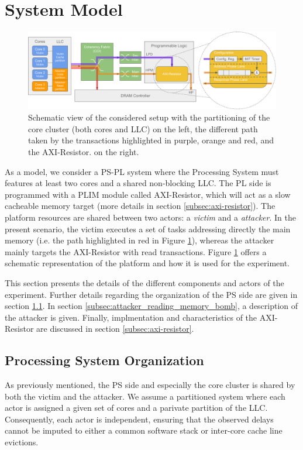 \section{System Model}
    \label{sec:system_model}
    \begin{figure}
        \centering
        \includegraphics[scale=0.56]{images/Evaluation_setup.pdf}
        \caption{Schematic view of the considered setup with the partitioning of the core cluster (both cores and LLC) on the left, the different path taken by the transactions highlighted in purple, orange and red, and the AXI-Resistor. on the right.}
        \label{fig:system_schematic}
    \end{figure}

    As a model, we consider a PS-PL system where the Processing System must features at least two cores and a shared non-blocking LLC.
    The PL side is programmed with a PLIM module called AXI-Resistor, which will act as a slow cacheable memory target (more details in section \ref{subsec:axi-resistor}).
    The platform resources are shared between two actors: a \emph{victim} and a \emph{attacker}.
    In the present scenario, the victim executes a set of tasks addressing directly the main memory (i.e. the path highlighted in red in Figure \ref{fig:system_schematic}), whereas the attacker mainly targets the AXI-Resistor with read transactions.
    Figure \ref{fig:system_schematic} offers a schematic representation of the platform and how it is used for the experiment.

    This section presents the details of the different components and actors of the experiment.
    Further details regarding the organization of the PS side are given in section \ref{subsec:processing_system_organization}.
    In section \ref{subsec:attacker_reading_memory_bomb}, a description of the attacker is given.
    Finally, implmentation and characteristics of the AXI-Resistor are discussed in section \ref{subsec:axi-resistor}.

    \subsection{Processing System Organization}
        \label{subsec:processing_system_organization}
        As previously mentioned, the PS side and especially the core cluster is shared by both the victim and the attacker.
        We assume a partitioned system where each actor is assigned a given set of cores and a parivate partition of the LLC.
        Consequently, each actor is independent, ensuring that the observed delays cannot be imputed to either a common software stack or inter-core cache line evictions.

